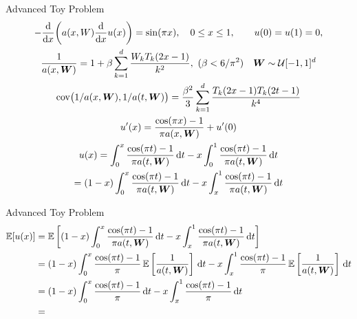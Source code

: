 \documentclass[11pt,compress,xcolor={usenames,dvipsnames},aspectratio=169]{beamer}
\begin{document}
\begin{frame}{Advanced Toy Problem}
\vspace{-4ex}
\begin{gather*}
-\frac{{\rm d} }{{\rm d} x}\biggl(a(x,W) \frac{{\rm d}}{{\rm d} x} u(x) \biggr) = \sin(\pi x), \quad 0 \leq x \leq 1, \qquad
u(0) = u(1) = 0, \\
\frac{1}{a(x,\boldsymbol{W})} = 1 + \beta \sum_{k=1}^d \frac{W_k T_{k}(2x-1)}{k^2} , \ (\beta < 6/\pi^2) \quad \boldsymbol{W} \sim \mathcal{U}[-1,1]^d \\
\operatorname{cov}\bigl(1/a(x,\boldsymbol{W}),1/a(t,\boldsymbol{W})\bigr) = \frac{\beta^2}{3} \sum_{k=1}^d \frac{ T_{k}(2x-1)T_{k}(2t-1)}{k^4}\\
u'(x) = \frac{\cos(\pi x)-1}{\pi a(x,\boldsymbol{W})} + u'(0)\\
u(x) = \int_0^x \frac{\cos(\pi t)-1}{\pi a(t,\boldsymbol{W})} \, {\rm d} t - x \int_0^1 \frac{\cos(\pi t)-1}{\pi a(t,\boldsymbol{W})} \, {\rm d} t \\
= (1-x) \int_0^x \frac{\cos(\pi t)-1}{\pi a(t,\boldsymbol{W})} \, {\rm d} t - x \int_x^1 \frac{\cos(\pi t)-1}{\pi a(t,\boldsymbol{W})} \, {\rm d} t
\end{gather*}

\end{frame}

\begin{frame}{Advanced Toy Problem}
\vspace{-4ex}
\begin{align*}
\operatorname{\mathbb{E}}[u(x)] &= \operatorname{\mathbb{E}}\left[ (1-x) \int_0^x \frac{\cos(\pi t)-1}{\pi a(t,\boldsymbol{W})} \, {\rm d} t - x \int_x^1 \frac{\cos(\pi t)-1}{\pi a(t,\boldsymbol{W})} \, {\rm d} t \right] \\
 &=(1-x) \int_0^x \frac{\cos(\pi t)-1}{\pi} \operatorname{\mathbb{E}}\left[ \frac{1}{a(t,\boldsymbol{W})} \right] \, {\rm d} t - x \int_x^1 \frac{\cos(\pi t)-1}{\pi} \operatorname{\mathbb{E}}\left[ \frac{1}{a(t,\boldsymbol{W})}  \right] \, {\rm d} t \\
 &=(1-x) \int_0^x \frac{\cos(\pi t)-1}{\pi} \, {\rm d} t - x \int_x^1 \frac{\cos(\pi t)-1}{\pi}  \, {\rm d} t \\
 & =
\end{align*}

\end{frame}
\end{document}
